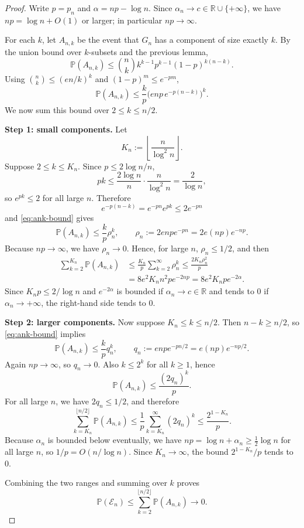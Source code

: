 \documentclass[11pt]{article}
\newcommand{\PP}{\mathbb{P}}
\newcommand{\bbinom}[2]{\binom{#1}{#2}}
\theoremstyle{plain}
\theoremstyle{definition}
\begin{document}
\begin{proof}
Write $p=p_n$ and $\alpha=np-\log n$.  Since $\alpha_n\to c\in\mathbb{R}\cup\{+\infty\}$, we have $np=\log n+O(1)$ or larger; in particular $np\to\infty$.

For each $k$, let $A_{n,k}$ be the event that $G_n$ has a component of size exactly $k$.  By the union bound over $k$-subsets and the previous lemma,
\begin{equation}\label{eq:ank-raw}
\PP(A_{n,k})
\le
\bbinom{n}{k} k^{k-1} p^{k-1}(1-p)^{k(n-k)}.
\end{equation}
Using $\binom{n}{k}\le (en/k)^k$ and $(1-p)^m\le e^{-pm}$,
\begin{equation}\label{eq:ank-bound}
\PP(A_{n,k})
\le
\frac{k}{p}\bigl(e n p \, e^{-p(n-k)}\bigr)^k.
\end{equation}
We now sum this bound over $2\le k\le n/2$.

\smallskip
\textbf{Step 1: small components.}
Let
\[
K_n := \left\lfloor \frac{n}{\log^2 n}\right\rfloor.
\]
Suppose $2\le k\le K_n$.  Since $p\le 2\log n/n$,
\[
pk \le \frac{2\log n}{n}\cdot \frac{n}{\log^2 n} = \frac{2}{\log n},
\]
so $e^{pk}\le 2$ for all large $n$.  Therefore
\[
e^{-p(n-k)} = e^{-pn}e^{pk} \le 2e^{-pn}
\]
and \eqref{eq:ank-bound} gives
\[
\PP(A_{n,k}) \le \frac{k}{p} \rho_n^k,
\qquad
\rho_n := 2e n p e^{-pn} = 2e (np)e^{-np}.
\]
Because $np\to\infty$, we have $\rho_n\to 0$.  Hence, for large $n$, $\rho_n\le 1/2$, and then
\begin{align*}
\sum_{k=2}^{K_n} \PP(A_{n,k})
&\le \frac{K_n}{p}\sum_{k=2}^{\infty} \rho_n^k
\le \frac{2K_n\rho_n^2}{p} \\
&= 8e^2 K_n n^2 p e^{-2np}
= 8e^2 K_n p e^{-2\alpha}.
\end{align*}
Since $K_n p\le 2/\log n$ and $e^{-2\alpha}$ is bounded if $\alpha_n\to c\in\mathbb{R}$ and tends to $0$ if $\alpha_n\to +\infty$, the right-hand side tends to $0$.

\smallskip
\textbf{Step 2: larger components.}
Now suppose $K_n\le k\le n/2$.  Then $n-k\ge n/2$, so \eqref{eq:ank-bound} implies
\[
\PP(A_{n,k})
\le
\frac{k}{p} q_n^k,
\qquad
q_n := e n p e^{-pn/2} = e(np)e^{-np/2}.
\]
Again $np\to\infty$, so $q_n\to 0$.  Also $k\le 2^k$ for all $k\ge 1$, hence
\[
\PP(A_{n,k}) \le \frac{(2q_n)^k}{p}.
\]
For all large $n$, we have $2q_n\le 1/2$, and therefore
\[
\sum_{k=K_n}^{\lfloor n/2\rfloor} \PP(A_{n,k})
\le
\frac{1}{p}\sum_{k=K_n}^{\infty} (2q_n)^k
\le
\frac{2^{1-K_n}}{p}.
\]
Because $\alpha_n$ is bounded below eventually, we have $np = \log n + \alpha_n \ge \tfrac12\log n$ for all large $n$, so $1/p = O(n/\log n)$.  Since $K_n\to\infty$, the bound $2^{1-K_n}/p$ tends to $0$.

Combining the two ranges and summing over $k$ proves
\[
\PP(\mathcal{E}_n)
\le
\sum_{k=2}^{\lfloor n/2\rfloor} \PP(A_{n,k})
\to 0.
\]
\end{proof}
\end{document}
